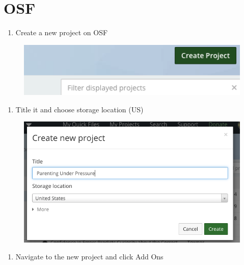\documentclass[]{book}
\providecommand{\tightlist}{%
  \setlength{\itemsep}{0pt}\setlength{\parskip}{0pt}}
\begin{document}
\hypertarget{osf}{%
\section{OSF}\label{osf}}

\begin{enumerate}
\def\labelenumi{\arabic{enumi}.}
\tightlist
\item
  Create a new project on OSF
\end{enumerate}

\begin{figure}
\centering
\includegraphics{images/research_protocols/osf/1.png}
\caption{}
\end{figure}

\begin{enumerate}
\def\labelenumi{\arabic{enumi}.}
\setcounter{enumi}{1}
\tightlist
\item
  Title it and choose storage location (US)
\end{enumerate}

\begin{figure}
\centering
\includegraphics{images/research_protocols/osf/2.png}
\caption{}
\end{figure}

\begin{enumerate}
\def\labelenumi{\arabic{enumi}.}
\setcounter{enumi}{2}
\tightlist
\item
  Navigate to the new project and click Add Ons
\end{enumerate}
\end{document}
